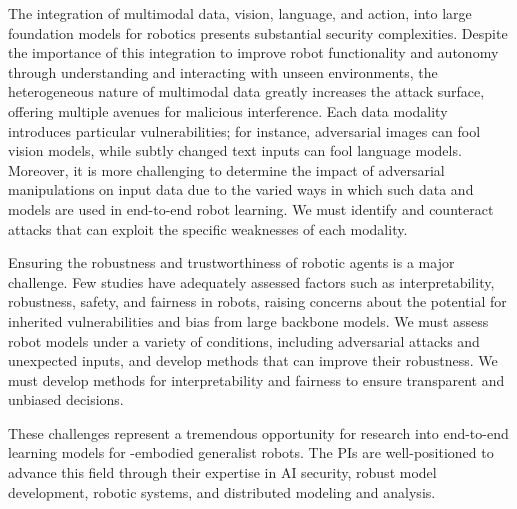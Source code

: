 The integration of multimodal data, \ie vision, language, and action, into large foundation models for robotics presents substantial security complexities. 
Despite the importance of this integration to improve robot functionality and autonomy through understanding and interacting with unseen environments, the heterogeneous nature of multimodal data greatly increases the attack surface, offering multiple avenues for malicious interference. 
Each data modality introduces particular vulnerabilities; for instance, adversarial images can fool vision models, while subtly changed text inputs can fool language models. Moreover, it is more challenging to determine the impact of adversarial manipulations on input data due to the varied ways in which such data and models are used in end-to-end robot learning.
We must identify and counteract attacks that can exploit the specific weaknesses of each modality. 

Ensuring the robustness and trustworthiness of robotic agents is a major challenge. %
Few studies have adequately assessed factors such as interpretability, robustness, safety, and fairness in robots, raising concerns about the potential for inherited vulnerabilities and bias from large backbone models. We must assess robot models
under a variety of conditions, including adversarial attacks and unexpected inputs, and develop methods that can improve their robustness.
We must develop methods for interpretability and fairness to ensure transparent and unbiased decisions.

These challenges represent a tremendous opportunity for research into end-to-end learning models for {\xo}-embodied generalist robots. The PIs are well-positioned to advance this field through their expertise in AI security, robust model development, robotic systems, and distributed modeling and analysis.

